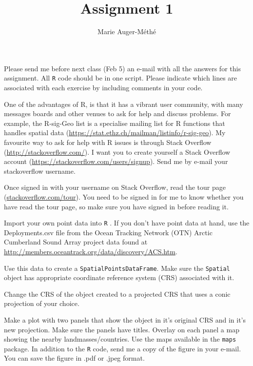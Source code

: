 \documentclass[11pt, oneside]{article}   	%
\title{Assignment 1}
\author{Marie Auger-M\'eth\'e}
\date{}							%
\begin{document}
\maketitle

Please send me before next class (Feb 5) an e-mail with all the answers for this assignment. All \texttt{R} code should be in one script. Please indicate which lines are associated with each exercise by including comments in your code.

\begin{Exercise}
One of the advantages of R, is that it has a vibrant user community, with many messages boards and other venues to ask for help and discuss problems. For example, the R-sig-Geo list is a specialise mailing list for R functions that handles spatial data (\url{https://stat.ethz.ch/mailman/listinfo/r-sig-geo}). My favourite way to ask for help with R issues is through Stack Overflow (\url{http://stackoverflow.com/}). I want you to create yourself a Stack Overflow account (\url{https://stackoverflow.com/users/signup}).
Send me by e-mail your stackoverflow username.
\end{Exercise}

\begin{Exercise}
Once signed in with your username on Stack Overflow, read the tour page (\href{http://stackoverflow.com/tour}{stackoverflow.com/tour}). You need to be signed in for me to know whether you have read the tour page, so make sure you have signed in before reading it. 
\end{Exercise}

\begin{Exercise}
Import your own point data into \texttt{R} . If you don't have point data at hand, use the Deployments.csv file from the Ocean Tracking Network (OTN) Arctic Cumberland Sound Array project data found at \url{http://members.oceantrack.org/data/discovery/ACS.htm}. 

\Question Use this data to create a \texttt{SpatialPointsDataFrame}. Make sure the \texttt{Spatial} object has appropriate coordinate reference system (CRS) associated with it. 

\Question Change the CRS of the object created to a projected CRS that uses a conic projection of your choice. 

\Question Make a plot with two panels that show the object in it's original CRS and in it's new projection. Make sure the panels have titles. Overlay on each panel a map showing the nearby landmasses/countries. Use the maps available in the \texttt{maps} package. In addition to the \texttt{R} code, send me a copy of the figure in your e-mail. You can save the figure in .pdf or .jpeg format. 
\end{Exercise}
\end{document}
